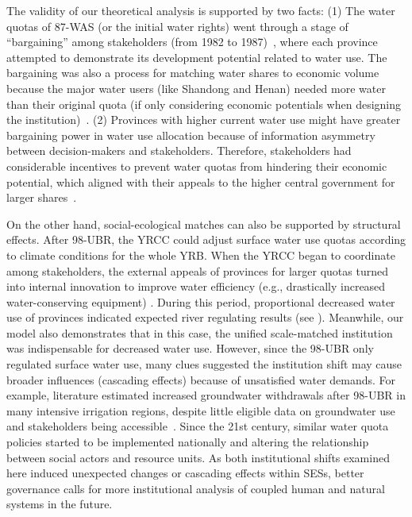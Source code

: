 The validity of our theoretical analysis is supported by two facts:
(1) The water quotas of 87-WAS (or the initial water rights) went through a stage of ``bargaining'' among stakeholders (from 1982 to 1987)~\cite{wang2019a, wang2019d}, where each province attempted to demonstrate its development potential related to water use.
The bargaining was also a process for matching water shares to economic volume because the major water users (like Shandong and Henan) needed more water than their original quota (if only considering economic potentials when designing the institution)~\cite{zuo2020}.
(2) Provinces with higher current water use might have greater bargaining power in water use allocation because of information asymmetry between decision-makers and stakeholders.
Therefore, stakeholders had considerable incentives to prevent water quotas from hindering their economic potential, which aligned with their appeals to the higher central government for larger shares~\cite{wang2019a, wang2019d}.

On the other hand, social-ecological matches can also be supported by structural effects.
After 98-UBR, the YRCC could adjust surface water use quotas according to climate conditions for the whole YRB.
When the YRCC began to coordinate among stakeholders, the external appeals of provinces for larger quotas turned into internal innovation to improve water efficiency (e.g., drastically increased water-conserving equipment)
\cite{krieger1955, ostrom1990}.
During this period, proportional decreased water use of provinces indicated expected river regulating results (see ).
Meanwhile, our model also demonstrates that in this case, the unified scale-matched institution was indispensable for decreased water use.
However, since the 98-UBR only regulated surface water use, many clues suggested the institution shift may cause broader influences (cascading effects) because of unsatisfied water demands.
For example, literature estimated increased groundwater withdrawals after 98-UBR in many intensive irrigation regions, despite little eligible data on groundwater use and stakeholders being accessible~\cite{sun2022b}.
Since the 21st century, similar water quota policies started to be implemented nationally and altering the relationship between social actors and resource units.
As both institutional shifts examined here induced unexpected changes or cascading effects within SESs, better governance calls for more institutional analysis of coupled human and natural systems in the future.

